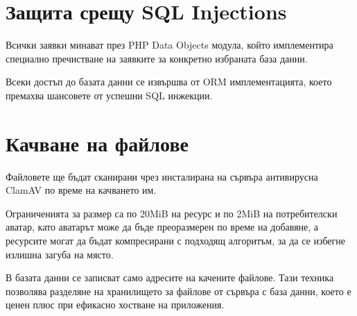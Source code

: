 \section{Защита срещу SQL Injections}

Всички заявки минават през PHP Data Objects модула,
който имплементира специално пречистване на заявките за
конкретно избраната база данни.

Всеки достъп до базата данни се извършва от ORM
имплементацията, което премахва шансовете от успешни
SQL инжекции.

\section{Качване на файлове}

Файловете ще бъдат сканирани чрез инсталирана на сървъра
антивирусна ClamAV по време на качването им.

Ограниченията за размер са по 20MiB на ресурс и по 2MiB
на потребителски аватар, като аватарът може да бъде
преоразмерен по време на добавяне, а ресурсите могат да
бъдат компресирани с подходящ алгоритъм, за да се избегне
излишна загуба на място.

В базата данни се записват само адресите на качените
файлове. Тази техника позволява разделяне на хранилището
за файлове от сървъра с база данни, което е ценен плюс
при ефикасно хостване на приложения.

